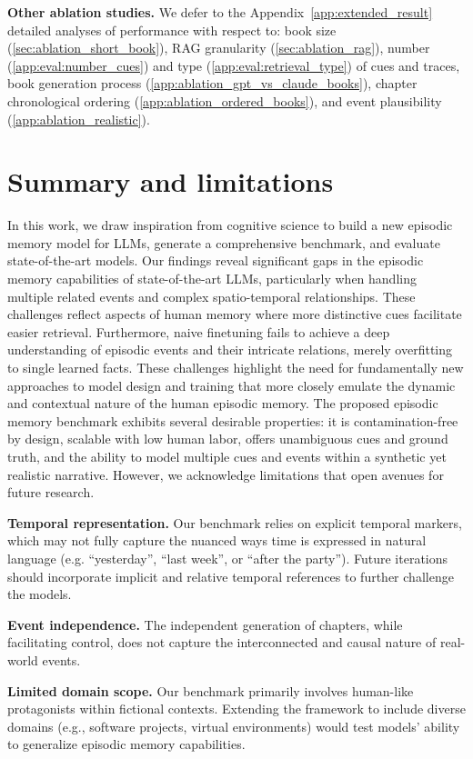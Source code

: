 \documentclass{article}
\begin{document}
\noindent \textbf{Other ablation studies.}
We defer to the Appendix~\ref{app:extended_result} detailed analyses of performance with respect to: book size (\ref{sec:ablation_short_book}), RAG granularity (\ref{sec:ablation_rag}), number (\ref{app:eval:number_cues}) and type (\ref{app:eval:retrieval_type}) of cues and traces, book generation process (\ref{app:ablation_gpt_vs_claude_books}), chapter chronological ordering (\ref{app:ablation_ordered_books}), and  event plausibility (\ref{app:ablation_realistic}).

\section{Summary and limitations}
In this work, we draw inspiration from cognitive science to build a new episodic memory model for LLMs, generate a comprehensive benchmark, and evaluate state-of-the-art models.
Our findings reveal significant gaps in the episodic memory capabilities of state-of-the-art LLMs, particularly when handling multiple related events and complex spatio-temporal relationships. These challenges reflect aspects of human memory where more distinctive cues facilitate easier retrieval. Furthermore, naive finetuning fails to achieve a deep understanding of episodic events and their intricate relations, merely overfitting to single learned facts. These challenges highlight the need for fundamentally new approaches to model design and training that more closely emulate the dynamic and contextual nature of the human episodic memory. The proposed episodic memory benchmark exhibits several desirable properties: it is contamination-free by design, scalable with low human labor, offers unambiguous cues and ground truth, and the ability to model multiple cues and events within a synthetic yet realistic narrative. However, we acknowledge  limitations that open avenues for future research.

\textbf{Temporal representation.} Our benchmark relies on explicit temporal markers, which may not fully capture the nuanced ways time is expressed in natural language (e.g. ``yesterday'', ``last week'', or ``after the party''). Future iterations should incorporate implicit and relative temporal references to further challenge the models.

\textbf{Event independence.} The independent generation of chapters, while facilitating control, does not capture the interconnected and causal nature of real-world events. 

\textbf{Limited domain scope.} Our benchmark primarily involves human-like protagonists within fictional contexts. Extending the framework to include diverse domains (e.g., software projects, virtual environments) would test models' ability to generalize episodic memory capabilities.
\end{document}
